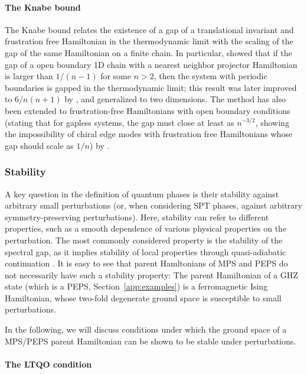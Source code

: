 \documentclass[rmp,aps,reprint,superscriptaddress,nobalancelastpage]{revtex4-1}
\begin{document}
    \paragraph{The Knabe bound} The Knabe bound relates the existence of a gap of a translational invariant and frustration free Hamiltonian in the thermodynamic limit with the scaling of the gap of the same  Hamiltonian on a finite chain.  In particular, \textcite{knabe:knabe-bound} showed that if the gap of a open boundary 1D chain with a nearest neighbor projector Hamiltonian is larger than $1/(n-1)$  for some $n>2$, then the system with periodic boundaries is gapped in the thermodynamic limit; this result was later improved  to $6/n(n+1)$ by \textcite{gosset:knabe-bound}, and generalized to two dimensions. The method has also been extended to frustration-free Hamiltonians with open boundary conditions (stating that for gapless systems, the gap must close at least as $n^{-3/2}$, showing the impossibility of chiral edge modes with frustration free Hamiltonians whose gap should scale as $1/n$) by \citet{mozgunov:knabe-bound-chiral}.






    \subsubsection{Stability}

    A key question in the definition of quantum phases is their stability against arbitrary small perturbations (or, when considering SPT phases, against arbitrary symmetry-preserving perturbations). Here, stability can refer to different properties, such as a smooth dependence of various physical properties on the perturbation.  The most commonly considered property is the stability of the spectral gap, as it implies stability of local properties through quasi-adiabatic continuation \cite{hastings:quasi-adiabatic}. It is easy to see that parent Hamltonians of MPS and PEPS do not necessarily have such a stability property: The parent Hamiltonian of a GHZ state (which is a PEPS, Section~\ref{app:examples}) is a ferromagnetic Ising Hamiltonian, whose two-fold degenerate ground space is susceptible to small perturbations.

    In the following, we will discuss conditions under which the ground space of a MPS/PEPS parent Hamiltonian can be shown to be stable under perturbations.


    \paragraph{The LTQO condition}
\end{document}
